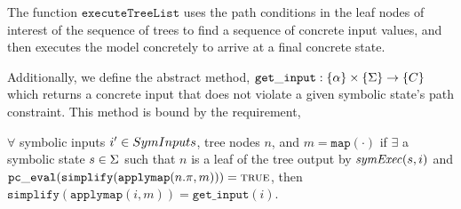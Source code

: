 The function $\mathtt{executeTreeList}$ uses the
    path conditions in the leaf nodes of interest of the sequence of trees to find a
    sequence of concrete input values, and then executes the model concretely to
    arrive at a final concrete state.
    
Additionally, we define the abstract method, $ \mathtt{get\_input} : \{\alpha\} \times \{\Sigma\} \rightarrow \{C\}$ which returns a concrete input that does not violate a given symbolic state's path constraint.
This method is bound by the requirement,

\begin{definition}
$ \forall$ symbolic inputs $i' \in SymInputs$, tree nodes $n$, and $m = \mathtt{map(\cdot)}$
if $\exists$ a symbolic state $s \in \Sigma$  such that
$n$ is a leaf of the tree output by $\mathit{symExec}(s, i)$ and 
$\mathtt{pc\_eval} (\mathtt{simplify}(\mathtt{applymap} (n.\pi, m))) = \mathtt{\textsc{true}}$, then
$\mathtt{simplify}(\mathtt{applymap} (i, m)) = \mathtt{get\_input}(i)$.
\end{definition}



